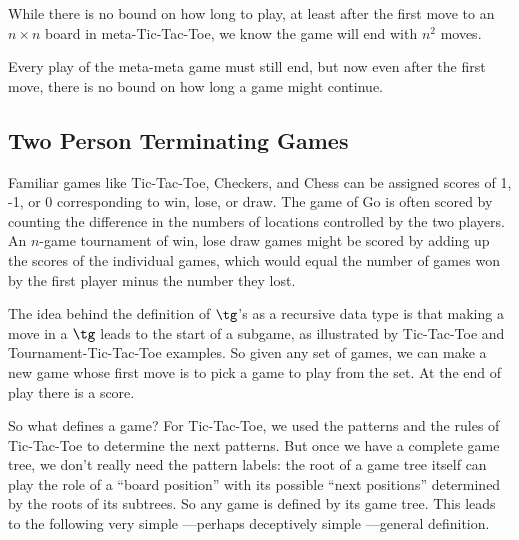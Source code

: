 \begin{definition}
\begin{editingnotes}

While there is no bound on how long to play, at least after the
first move to an $n \times n$ board in meta-Tic-Tac-Toe, we know the game
will end with $n^2$ moves.

\end{editingnotes}

\iffalse
Now that we recognize $T^4$ as a \tg, we can go on to
a \emph{meta}-$T^4$ game, where the first player chooses a number,
$m>0$, of $T^4$ games to play, and then the second player gets the
first move in each of the individual $T^4$ games to be played.

Then, of course, there's meta-meta-$T^4$\dots.
\fi

\begin{editingnotes}
Every play of the meta-meta game must still end, but now even
after the first move, there is no bound on how long a game might
continue.
\end{editingnotes}

\subsection{Two Person Terminating Games}

Familiar games like Tic-Tac-Toe, Checkers, and Chess can be assigned
scores of 1, -1, or 0 corresponding to win, lose, or draw.  The game of Go
is often scored by counting the difference in the numbers of locations
controlled by the two players.  An $n$-game tournament of win, lose draw
games might be scored by adding up the scores of the individual games,
which would equal the number of games won by the first player minus the
number they lost.  \iffalse A negative score would mean the second player
won more games.\fi

The idea behind the definition of $\tg$'s as a recursive data type is that
making a move in a $\tg$ leads to the start of a subgame, as illustrated
by Tic-Tac-Toe and Tournament-Tic-Tac-Toe examples.  So given any set of
games, we can make a new game whose first move is to pick a game to play
from the set.  At the end of play there is a score.

So what defines a game?  For Tic-Tac-Toe, we used the patterns and the
rules of Tic-Tac-Toe to determine the next patterns.  But once we have
a complete game tree, we don't really need the pattern labels: the
root of a game tree itself can play the role of a ``board position''
with its possible ``next positions'' determined by the roots of its
subtrees.  So any game is defined by its game tree.  This leads to the
following very simple ---perhaps deceptively simple ---general
definition.


\end{definition}
